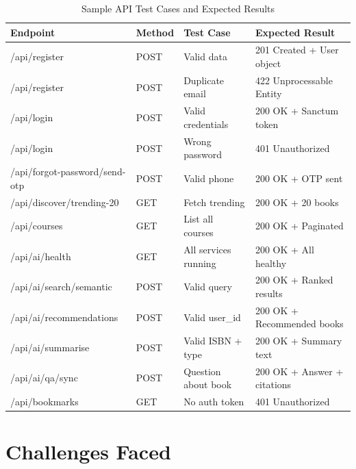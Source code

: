 \begin{table}[H]
\centering
\caption{Sample API Test Cases and Expected Results}
\begin{tabularx}{\textwidth}{|l|l|l|X|}
\hline
\textbf{Endpoint} & \textbf{Method} & \textbf{Test Case} & \textbf{Expected Result} \\
\hline
/api/register        & POST & Valid data            & 201 Created + User object \\
\hline
/api/register        & POST & Duplicate email       & 422 Unprocessable Entity \\
\hline
/api/login           & POST & Valid credentials     & 200 OK + Sanctum token \\
\hline
/api/login           & POST & Wrong password        & 401 Unauthorized \\
\hline
/api/forgot-password/send-otp & POST & Valid phone & 200 OK + OTP sent \\
\hline
/api/discover/trending-20 & GET & Fetch trending   & 200 OK + 20 books \\
\hline
/api/courses         & GET  & List all courses      & 200 OK + Paginated \\
\hline
/api/ai/health       & GET  & All services running  & 200 OK + All healthy \\
\hline
/api/ai/search/semantic & POST & Valid query        & 200 OK + Ranked results \\
\hline
/api/ai/recommendations & POST & Valid user\_id    & 200 OK + Recommended books \\
\hline
/api/ai/summarise    & POST & Valid ISBN + type     & 200 OK + Summary text \\
\hline
/api/ai/qa/sync      & POST & Question about book   & 200 OK + Answer + citations \\
\hline
/api/bookmarks       & GET  & No auth token         & 401 Unauthorized \\
\hline
\end{tabularx}
\end{table}

\section{Challenges Faced}
\label{sec:ch4challenges}

